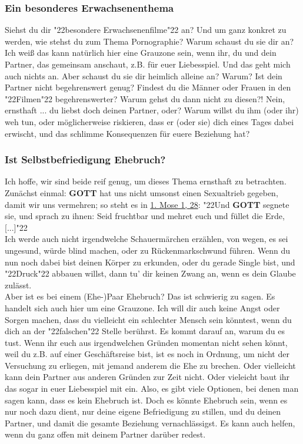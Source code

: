 \documentclass[10pt,a5paper]{article}
\newcommand{\Gott}[0]{\textbf{GOTT}}
\newcommand{\q}[1]{\char"22{#1}\char"22 }
\begin{document}
	\subsubsection{Ein besonderes Erwachsenenthema}
		Siehst du dir \q{besondere Erwachsenenfilme} an?
		Und um ganz konkret zu werden,
		wie stehst du zum Thema Pornographie?
		Warum schaust du sie dir an?
		Ich wei{\ss}
		das kann nat\"urlich hier eine Grauzone sein,
		wenn ihr,
		du und dein Partner,
		das gemeinsam anschaut,
		z.B. f\"ur euer Liebesspiel.
		Und das geht mich auch nichts an.
		Aber schaust du sie dir heimlich alleine an?
		Warum?
		Ist dein Partner nicht begehrenswert genug?
		Findest du die M\"anner oder Frauen in den \q{Filmen} begehrenswerter?
		Warum gehst du dann nicht zu diesen?!
		Nein,
		ernsthaft ...
		du liebst doch deinen Partner, oder?
		Warum willst du ihm (oder ihr) weh tun,
		oder m\"oglicherweise riskieren,
		dass er (oder sie) dich eines Tages dabei erwischt,
		und das schlimme Konsequenzen f\"ur euere Beziehung hat?
						
	\subsubsection{Ist Selbstbefriedigung Ehebruch?}
		Ich hoffe,
		wir sind beide reif genug,
		um dieses Thema ernsthaft zu betrachten.
		Zun\"achst einmal:
		{\Gott} hat uns nicht umsonst einen Sexualtrieb gegeben,
		damit wir uns vermehren;
		so steht es in \href{https://www.die-bibel.de/bibeln/online-bibeln/lesen/LU17/GEN.1/1.-Mose-1}{1. Mose 1, 28}:
		\q{Und {\Gott} segnete sie,
		und sprach zu ihnen:
		Seid fruchtbar und mehret euch und f\"ullet die Erde, [...]}
		\\
		Ich werde auch nicht irgendwelche Schauerm\"archen erz\"ahlen,
		von wegen,
		es sei ungesund,
		w\"urde blind machen,
		oder zu R\"uckenmarkschwund f\"uhren.
		Wenn du nun noch dabei bist deinen K\"orper zu erkunden,
		oder du gerade Single bist,
		und \q{Druck} abbauen willst,
		dann tu' dir keinen Zwang an,
		wenn es dein Glaube zul\"asst.
		\\
		Aber ist es bei einem (Ehe-)Paar Ehebruch?
		Das ist schwierig zu sagen.
		Es handelt sich auch hier um eine Grauzone.
		Ich will dir auch keine Angst oder Sorgen machen,
		dass du vielleicht ein schlechter Mensch sein k\"onntest,
		wenn du dich an der \q{falschen} Stelle ber\"uhrst.
		Es kommt darauf an,
		warum du es tust.
		Wenn ihr euch aus irgendwelchen Gr\"unden momentan nicht sehen k\"onnt,
		weil du z.B. auf einer Gesch\"aftsreise bist,
		ist es noch in Ordnung,
		um nicht der Versuchung zu erliegen,
		mit jemand anderem die Ehe zu brechen.
		Oder vielleicht kann dein Partner aus anderen Gr\"unden zur Zeit nicht.
		Oder vieleicht baut ihr das sogar in euer Liebesspiel mit ein.
		Also,
		es gibt viele Optionen,
		bei denen man sagen kann,
		dass es kein Ehebruch ist.
		Doch es k\"onnte Ehebruch sein,
		wenn es nur noch dazu dient,
		nur deine eigene Befriedigung zu stillen,
		und du deinen Partner,
		und damit die gesamte Beziehung vernachl\"assigst.
		Es kann auch helfen,
		wenn du ganz offen mit deinem Partner dar\"uber redest.
		
\end{document}
